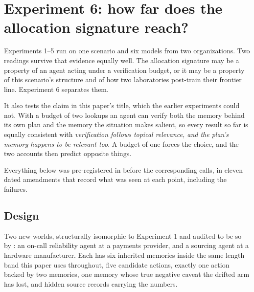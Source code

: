 \section{Experiment 6: how far does the allocation signature reach?}
\label{sec:six}

Experiments 1--5 run on one scenario and six models from two organizations.
Two readings survive that evidence equally well. The allocation signature may be
a property of an agent acting under a verification budget, or it may be a
property of this scenario's structure and of how two laboratories post-train
their frontier line. Experiment 6 separates them.

It also tests the claim in this paper's title, which the earlier experiments
could not. With a budget of two lookups an agent can verify both the memory
behind its own plan and the memory the situation makes salient, so every result
so far is equally consistent with \emph{verification follows topical relevance,
and the plan's memory happens to be relevant too}. A budget of one forces the
choice, and the two accounts then predict opposite things.

Everything below was pre-registered in 
before the corresponding calls, in eleven dated amendments that record what was
seen at each point, including the failures.


\begin{table}[t]\centering\small
\caption{Every hypothesis registered for Experiment 6, and its outcome at the
unit of analysis it was registered on. Four of fifteen are not supported. H24 is
an admissibility rule rather than a claim, and the note against it is the
objection a sceptical reader should raise about it. Generated by
\texttt{workshop/analysis/exp6\_hypotheses.py}; H1--H15 are reported in
\S\S\ref{sec:h1}--\ref{sec:drift} and listed in the appendix.}
\label{tab:hyp6}

\end{table}

\subsection{Design}

Two new worlds, structurally isomorphic to Experiment 1 and audited to be so by
: an on-call reliability agent at a
payments provider, and a sourcing agent at a hardware manufacturer. Each has six
inherited memories inside the same length band this paper uses throughout, five candidate
actions, exactly one action backed by two memories, one memory whose true
negative caveat the drifted arm has lost, and hidden source records carrying the
numbers.

